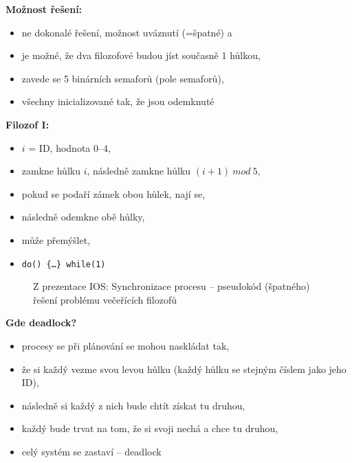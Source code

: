 \documentclass[a4paper, 11pt]{article}
\newcommand{\tcmd}[1]{\texttt{#1}}
\begin{document}
\textbf{Možnost řešení:}
\begin{itemize}
    \item ne dokonalé řešení, možnost uváznutí (=špatné) a
    \item je možné, že dva filozofové budou jíst současně 1 hůlkou,
    \item zavede se 5 binárních semaforů (pole semaforů),
    \item všechny inicializované tak, že jsou odemknuté
\end{itemize}
 
\textbf{Filozof I:}
\begin{itemize}
    \item $i$ = ID, hodnota 0--4,
    \item zamkne hůlku $i$, následně zamkne hůlku $(i+1)\ mod\ 5$,
    \item pokud se podaří zámek obou hůlek, nají se,
    \item následně odemkne obě hůlky,
    \item může přemýšlet,
    \item \tcmd{do() \{\ldots\} while(1)}
\end{itemize}

\begin{figure} [htb]
    \centering
    \caption{Z prezentace IOS: Synchronizace procesu -- pseudokód (špatného) řešení problému večeřících filozofů}
\end{figure}

\textbf{Gde deadlock?}
\begin{itemize}
    \item procesy se při plánování se mohou naskládat tak,
    \item že si každý vezme svou levou hůlku (každý hůlku se stejným číslem jako jeho ID),
    \item následně si každý z nich bude chtít získat tu druhou,
    \item každý bude trvat na tom, že si svoji nechá a chce tu druhou,
    \item celý systém se zastaví -- deadlock
\end{itemize}
 
\end{document}
